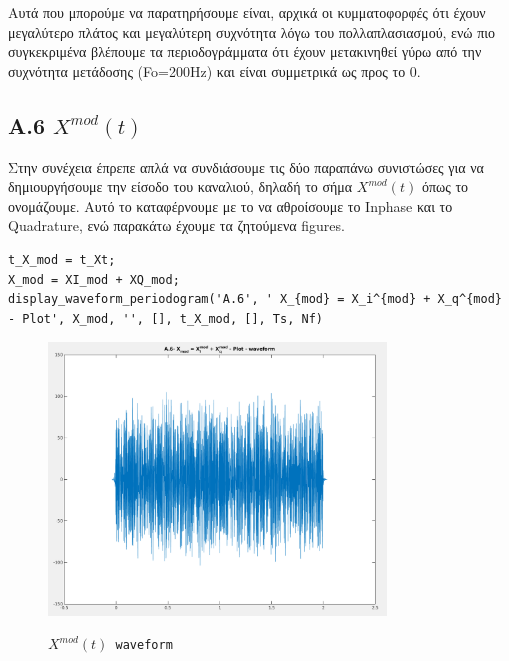 \documentclass[11pt]{article}
\begin{document}
    \par \noindent
    Αυτά που μπορούμε να παρατηρήσουμε είναι, αρχικά οι κυμματοφορφές ότι έχουν μεγαλύτερο πλάτος και μεγαλύτερη συχνότητα λόγω του πολλαπλασιασμού, ενώ πιο συγκεκριμένα βλέπουμε τα περιοδογράμματα ότι έχουν μετακινηθεί γύρω από την συχνότητα μετάδοσης (Fo=200Hz) και είναι συμμετρικά ως προς το 0.
    
    \subsection*{A.6  $X^{mod}(t)$}
    Στην συνέχεια έπρεπε απλά να συνδιάσουμε τις δύο παραπάνω συνιστώσες για να δημιουργήσουμε την είσοδο του καναλιού, δηλαδή το σήμα $X^{mod}(t)$ όπως το ονομάζουμε. 
    Αυτό το καταφέρνουμε με το να αθροίσουμε το Inphase και το Quadrature, ενώ παρακάτω έχουμε τα ζητούμενα figures. 
    
    
    \begin{lstlisting}[caption = {A.6 \texttt{Calculate $X^{mod}(t)$}}]
% A.6
t_X_mod = t_Xt;
X_mod = XI_mod + XQ_mod;
display_waveform_periodogram('A.6', ' X_{mod} = X_i^{mod} + X_q^{mod} - Plot', X_mod, '', [], t_X_mod, [], Ts, Nf)
    \end{lstlisting}
    
    \begin{figure}[H]
        \centering
        \includegraphics[scale=0.5, width=0.8\textwidth]{img/A6_mod_wave.png} \\
        \caption{\texttt{$X^{mod}(t)$ waveform}}
    \end{figure}
    
\end{document}
